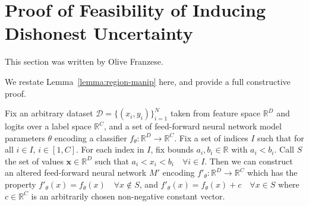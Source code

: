 \section{Proof of Feasibility of Inducing Dishonest Uncertainty}
\label{app:region-manip-proof}

\begin{contriback}
This section was written by Olive Franzese.
\end{contriback}

We restate Lemma~\ref{lemma:region-manip} here, and provide a full constructive proof.

\begin{lemma} \label{restated-lemma:region-manip}
    Fix an arbitrary dataset $\mathcal{D}=\{(x_i, y_i)\}^{N}_{i=1}$ taken from feature space $\mathbb{R}^D$ and logits over a label space $\mathbb{R}^{C}$, and a set of feed-forward neural network model parameters $\theta$ encoding a classifier $f_{\theta}: \mathbb{R}^D \to \mathbb{R}^C$. Fix a set of indices $I$ such that for all $i \in I$, $i \in [1, C]$. For each index in $I$, fix bounds $a_i, b_i \in \mathbb{R}$ with $a_i < b_i$. Call $S$ the set of values $\mathbf{x} \in \mathbb{R}^D$ such that $a_i < x_i < b_i \quad \forall i \in I$. Then we can construct an altered feed-forward neural network $M'$ encoding $f'_{\theta}: \mathbb{R}^D \to \mathbb{R}^C$ which has the property $f'_{\theta}(x) = f_{\theta}(x) \quad \forall x \notin S$, and $f'_\theta(x)=f_\theta(x) + c \quad \forall x \in S$ where $c \in \mathbb{R}^C$ is an arbitrarily chosen non-negative constant vector.
\end{lemma} 

